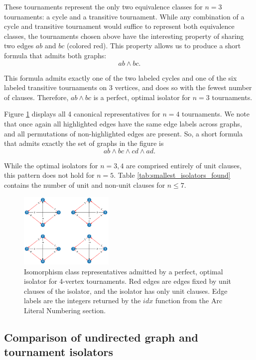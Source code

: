 \documentclass[conference]{IEEEtran}
\begin{document}
These tournaments represent the only two equivalence classes for $n=3$ tournaments: a cycle and a transitive tournament. While any combination of a cycle and transitive tournament would suffice to represent both equivalence classes, the tournaments chosen above have the interesting property of sharing two edges $ab$ and $bc$ (colored red). This property allows us to produce a short formula that admits both graphs:
\[
ab \land bc.
\]

This formula admits exactly one of the two labeled cycles and one of the six labeled transitive tournaments on 3 vertices, and does so with the fewest number of clauses. Therefore, $ab \land bc$ is a perfect, optimal isolator for $n=3$ tournaments.

Figure \ref{iso4} displays all 4 canonical representatives for $n=4$ tournaments. We note that once again all highlighted edges have the same edge labels across graphs, and all permutations of non-highlighted edges are present. So, a short formula that admits exactly the set of graphs in the figure is
\[
ab \land bc \land cd \land ad.
\]

While the optimal isolators for $n=3,4$ are comprised entirely of unit clauses, this pattern does not hold for $n=5$. Table \ref{tab:smallest_isolators_found} contains the number of unit and non-unit clauses for $n \le 7$.

\begin{figure}
\centering
\includegraphics[width=0.4\textwidth]{iso_4.png}
\caption{Isomorphism class representatives admitted by a perfect, optimal isolator for 4-vertex tournaments. Red edges are edges fixed by unit clauses of the isolator, and the isolator has only unit clauses. Edge labels are the integers returned by the $\mathit{idx}$ function from the Arc Literal Numbering section.} \label{iso4}
\end{figure}

\subsection{Comparison of undirected graph and tournament isolators}
\end{document}
